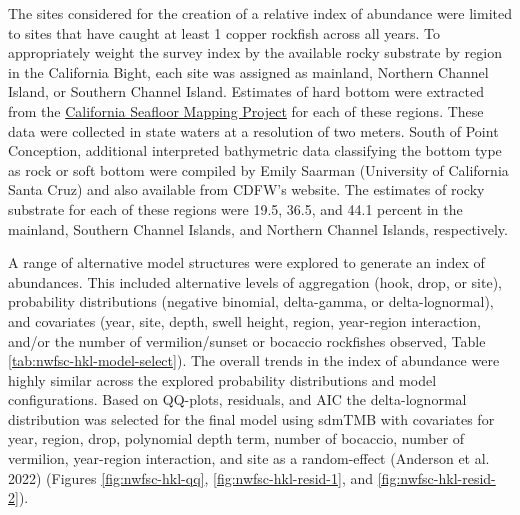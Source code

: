 \documentclass[11pt,
  english,
  letterpaper,
]{article}
\begin{document}
The sites considered for the creation of a relative index of abundance were limited to sites that have caught at least 1 copper rockfish across all years. To appropriately weight the survey index by the available rocky substrate by region in the California Bight, each site was assigned as mainland, Northern Channel Island, or Southern Channel Island. Estimates of hard bottom were extracted from the \href{http://seafloor.otterlabs.org/index.html}{California Seafloor Mapping Project} for each of these regions. These data were collected in state waters at a resolution of two meters. South of Point Conception, additional interpreted bathymetric data classifying the bottom type as rock or soft bottom were compiled by Emily Saarman (University of California Santa Cruz) and also available from CDFW's website. The estimates of rocky substrate for each of these regions were 19.5, 36.5, and 44.1 percent in the mainland, Southern Channel Islands, and Northern Channel Islands, respectively.

A range of alternative model structures were explored to generate an index of abundances. This included alternative levels of aggregation (hook, drop, or site), probability distributions (negative binomial, delta-gamma, or delta-lognormal), and covariates (year, site, depth, swell height, region, year-region interaction, and/or the number of vermilion/sunset or bocaccio rockfishes observed, Table \ref{tab:nwfsc-hkl-model-select}). The overall trends in the index of abundance were highly similar across the explored probability distributions and model configurations. Based on QQ-plots, residuals, and AIC the delta-lognormal distribution was selected for the final model using sdmTMB with covariates for year, region, drop, polynomial depth term, number of bocaccio, number of vermilion, year-region interaction, and site as a random-effect (Anderson et al. 2022) (Figures \ref{fig:nwfsc-hkl-qq}, \ref{fig:nwfsc-hkl-resid-1}, and \ref{fig:nwfsc-hkl-resid-2}).

\begingroup\fontsize{9}{11}\selectfont
\end{document}
